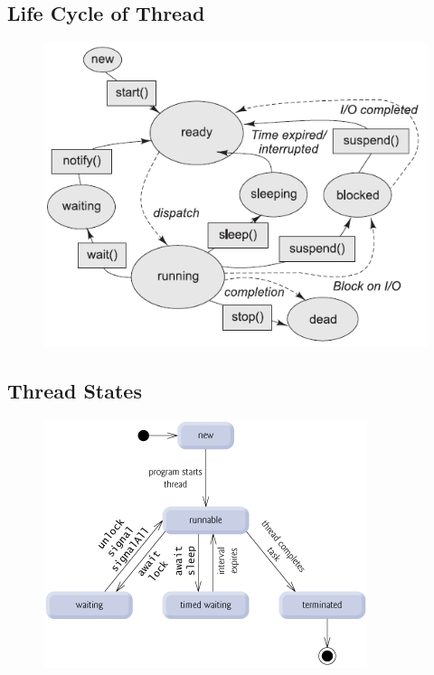 \documentclass[12pt, a4paper]{book}
\begin{document}
\subsection{Life Cycle of Thread}
\begin{figure}[h]
    \centering
    \includegraphics[width=0.9\linewidth]{figures/Life-cycle-of-Java-threads.png}
\end{figure}
\subsection{Thread States}
\begin{figure}[h]
    \centering
    \includegraphics[width=0.9\linewidth]{figures/thread-states.png}
\end{figure}
\end{document}
